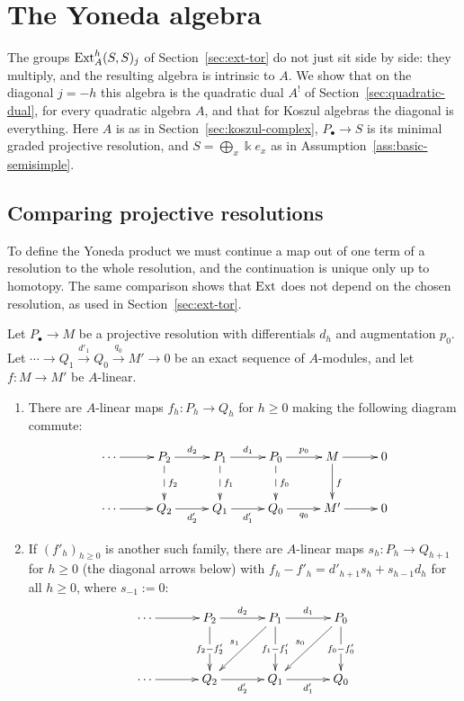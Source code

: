 \clearpage
\section{The Yoneda algebra}\label{sec:yoneda}

The groups $\operatorname{Ext}\nolimits_A^h(S,S)_j$ of Section~\ref{sec:ext-tor} do not just sit side by side: they multiply, and the resulting algebra is intrinsic to $A$.
We show that on the diagonal $j=-h$ this algebra is the quadratic dual $A^!$ of Section~\ref{sec:quadratic-dual}, for every quadratic algebra $A$, and that for Koszul algebras the diagonal is everything.
Here $A$ is as in Section~\ref{sec:koszul-complex}, $P_\bullet\to S$ is its minimal graded projective resolution, and $S=\bigoplus_x\Bbbk e_x$ as in Assumption~\ref{ass:basic-semisimple}.

\subsection{Comparing projective resolutions}\label{subsec:comparison}

To define the Yoneda product we must continue a map out of one term of a resolution to the whole resolution, and the continuation is unique only up to homotopy.
The same comparison shows that $\operatorname{Ext}\nolimits$ does not depend on the chosen resolution, as used in Section~\ref{sec:ext-tor}.

\begin{lemma}\label{lem:comparison}
Let $P_\bullet\to M$ be a projective resolution with differentials $d_h$ and augmentation $p_0$.
Let $\cdots\to Q_1\xrightarrow{d'_1}Q_0\xrightarrow{q_0}M'\to0$ be an exact sequence of $A$-modules, and let $f:M\to M'$ be $A$-linear.
\begin{enumerate}
\item There are $A$-linear maps $f_h:P_h\to Q_h$ for $h\geq0$ making the following diagram commute:
\[
\xymatrix@C=26pt@R=26pt{
\cdots\ar[r]&P_2\ar[r]^{d_2}\ar@{-->}[d]^{f_2}&P_1\ar[r]^{d_1}\ar@{-->}[d]^{f_1}&P_0\ar[r]^{p_0}\ar@{-->}[d]^{f_0}&M\ar[r]\ar[d]^{f}&0\\
\cdots\ar[r]&Q_2\ar[r]_{d'_2}&Q_1\ar[r]_{d'_1}&Q_0\ar[r]_{q_0}&M'\ar[r]&0
}
\]
\item If $(f'_h)_{h\geq0}$ is another such family, there are $A$-linear maps $s_h:P_h\to Q_{h+1}$ for $h\geq0$ (the diagonal arrows below) with $f_h-f'_h=d'_{h+1}s_h+s_{h-1}d_h$ for all $h\geq0$, where $s_{-1}:=0$:
\[
\xymatrix@C=34pt@R=34pt{
\cdots\ar[r]&P_2\ar[r]^{d_2}\ar[d]|{f_2-f'_2}&P_1\ar[r]^{d_1}\ar[d]|{f_1-f'_1}\ar[dl]_{s_1}&P_0\ar[d]|{f_0-f'_0}\ar[dl]_{s_0}\\
\cdots\ar[r]&Q_2\ar[r]_{d'_2}&Q_1\ar[r]_{d'_1}&Q_0
}
\]
\end{enumerate}
\end{lemma}

